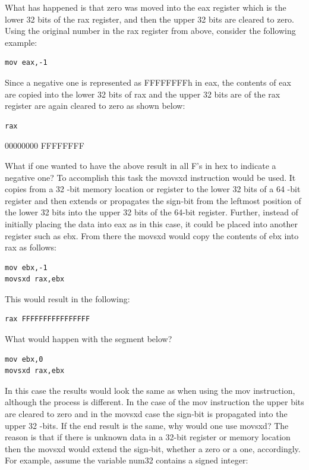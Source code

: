 \documentclass[10pt]{book}
\begin{document}
\begin{center}
\begin{center}
\begin{center}
\begin{center}
What has happened is that zero was moved into the eax register which is the lower 32 bits of the rax register, and then the upper 32 bits are cleared to zero. Using the original number in the rax register from above, consider the following example:

\begin{verbatim}
mov eax,-1
\end{verbatim}

Since a negative one is represented as FFFFFFFFh in eax, the contents of eax are copied into the lower 32 bits of rax and the upper 32 bits are of the rax register are again cleared to zero as shown below:

\begin{verbatim}
rax
\end{verbatim}

00000000 FFFFFFFF

What if one wanted to have the above result in all F's in hex to indicate a negative one? To accomplish this task the movsxd instruction would be used. It copies from a 32 -bit memory location or register to the lower 32 bits of a 64 -bit register and then extends or propagates the sign-bit from the leftmost position of the lower 32 bits into the upper 32 bits of the 64-bit register. Further, instead of initially placing the data into eax as in this case, it could be placed into another register such as ebx. From there the movsxd would copy the contents of ebx into rax as follows:

\begin{verbatim}
mov ebx,-1
movsxd rax,ebx
\end{verbatim}

This would result in the following:

\begin{verbatim}
rax FFFFFFFFFFFFFFFF
\end{verbatim}

What would happen with the segment below?


\begin{verbatim}
mov ebx,0
movsxd rax,ebx
\end{verbatim}

In this case the results would look the same as when using the mov instruction, although the process is different. In the case of the mov instruction the upper bits are cleared to zero and in the movsxd case the sign-bit is propagated into the upper 32 -bits. If the end result is the same, why would one use movsxd? The reason is that if there is unknown data in a 32-bit register or memory location then the movsxd would extend the sign-bit, whether a zero or a one, accordingly. For example, assume the variable num32 contains a signed integer:


\end{center}
\end{center}
\end{center}
\end{center}
\end{document}
